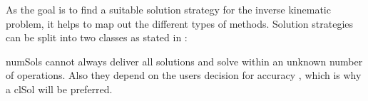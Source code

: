 As the goal is to find a suitable solution strategy for the inverse kinematic problem, it helps to map out the different types of methods.
Solution strategies can be split into two classes as stated in %
\cite{invKinSeriallinkMani}:\\
\medskip


\medskip


\Glspl{numSol} 
cannot always deliver all solutions and solve within an unknown number of operations. Also they depend on the users decision for accuracy \cite{invKinSeriallinkMani}, which is why a \gls{clSol} will be preferred.\\

